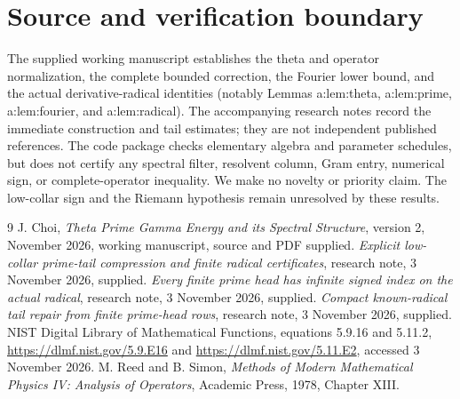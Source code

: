 \documentclass[11pt]{article}
\begin{document}
\section{Source and verification boundary}\label{sec:scope}
The supplied working manuscript \cite{source} establishes the theta and operator normalization, the complete bounded correction, the Fourier lower bound, and the actual derivative-radical identities (notably Lemmas a:lem:theta, a:lem:prime, a:lem:fourier, and a:lem:radical). The accompanying research notes \cite{collarnote,indexnote,repairnote} record the immediate construction and tail estimates; they are not independent published references. The code package checks elementary algebra and parameter schedules, but does not certify any spectral filter, resolvent column, Gram entry, numerical sign, or complete-operator inequality. We make no novelty or priority claim. The low-collar sign and the Riemann hypothesis remain unresolved by these results.

\begin{thebibliography}{9}
 J. Choi, \emph{Theta Prime Gamma Energy and its Spectral Structure}, version 2, November 2026, working manuscript, source and PDF supplied.
 \emph{Explicit low-collar prime-tail compression and finite radical certificates}, research note, 3 November 2026, supplied.
 \emph{Every finite prime head has infinite signed index on the actual radical}, research note, 3 November 2026, supplied.
 \emph{Compact known-radical tail repair from finite prime-head rows}, research note, 3 November 2026, supplied.
 NIST Digital Library of Mathematical Functions, equations 5.9.16 and 5.11.2, \url{https://dlmf.nist.gov/5.9.E16} and \url{https://dlmf.nist.gov/5.11.E2}, accessed 3 November 2026.
 M. Reed and B. Simon, \emph{Methods of Modern Mathematical Physics IV: Analysis of Operators}, Academic Press, 1978, Chapter XIII.
\end{thebibliography}
\end{document}
